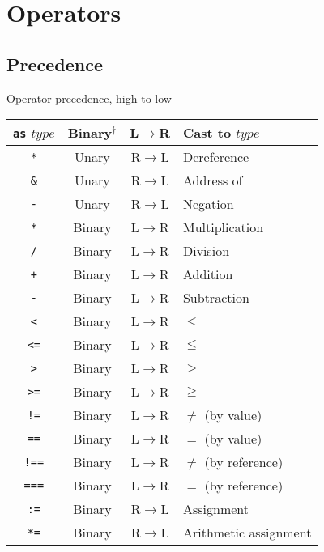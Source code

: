 \documentclass{article}
\begin{document}
\section{Operators}
\label{sec:operators}

\subsection{Precedence}
\label{sub:operators:precedence}
\begin{center}
  \begin{threeparttable}
    \caption{Operator precedence, high to low}
    \begin{tabular}{|c|c|c|l|}
      \hline
      \texttt{as} $type$ & Binary$^\dagger$ & L$\to$R & Cast to $type$ \\ \hline
      \texttt{*} & Unary & R$\to$L & Dereference \\
      \texttt{\&} & Unary & R$\to$L & Address of \\
      \texttt{-} & Unary & R$\to$L & Negation \\ \hline
      \texttt{*} & Binary & L$\to$R & Multiplication \\
      \texttt{/} & Binary & L$\to$R & Division \\ \hline
      \texttt{+} & Binary & L$\to$R & Addition \\
      \texttt{-} & Binary & L$\to$R & Subtraction \\ \hline
      \texttt{<} & Binary & L$\to$R & $<$ \\
      \texttt{<=} & Binary & L$\to$R & $\leq$ \\
      \texttt{>} & Binary & L$\to$R & $>$ \\
      \texttt{>=} & Binary & L$\to$R & $\geq$ \\ \hline
      \texttt{!=} & Binary & L$\to$R & $\not=$ (by value) \\
      \texttt{==} & Binary & L$\to$R & $=$ (by value) \\
      \texttt{!==} & Binary & L$\to$R & $\not=$ (by reference) \\
      \texttt{===} & Binary & L$\to$R & $=$ (by reference) \\ \hline
      \texttt{:=} & Binary & R$\to$L & Assignment \\
      \texttt{*=} & Binary & R$\to$L & Arithmetic assignment \\

\end{tabular}
\end{threeparttable}
\end{center}
\end{document}
